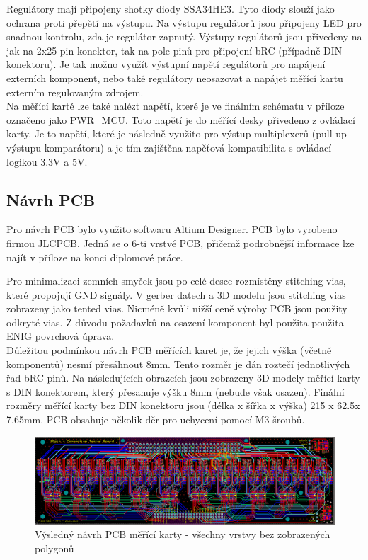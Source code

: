 Regulátory mají připojeny shotky diody SSA34HE3. Tyto diody slouží jako ochrana proti přepětí na výstupu.
Na výstupu regulátorů jsou připojeny LED pro snadnou kontrolu, zda je regulátor zapnutý.
Výstupy regulátorů jsou přivedeny na jak na 2x25 pin konektor, tak na pole pinů pro připojení bRC (případně DIN konektoru).
Je tak možno využít výstupní napětí regulátorů pro napájení externích komponent, nebo
také regulátory neosazovat a napájet měřící kartu externím regulovaným zdrojem.\\

Na měřící kartě lze také nalézt napětí, které je ve finálním schématu v příloze označeno jako PWR\_MCU.
Toto napětí je do měřící desky přivedeno z ovládací karty. Je to napětí, které je následně využito
pro výstup multiplexerů (pull up výstupu komparátoru) a je tím zajištěna napěťová kompatibilita s ovládací logikou 3.3V a 5V.


\subsection{Návrh PCB}
Pro návrh PCB bylo využito softwaru Altium Designer. PCB bylo vyrobeno firmou
JLCPCB. Jedná se o 6-ti vrstvé PCB, přičemž podrobnější informace lze najít v příloze na konci diplomové práce.

Pro minimalizaci zemních smyček jsou po celé desce rozmístěny stitching vias,
které propojují GND signály.
V gerber datech a 3D modelu jsou stitching vias zobrazeny jako tented vias. Nicméně kvůli nižší ceně výroby PCB
jsou použity odkryté vias.
Z důvodu požadavků na osazení komponent byl použita použita ENIG povrchová úprava.\\

Důležitou podmínkou návrh PCB měřících karet je, že jejich výška (včetně komponentů) nesmí přesáhnout 8mm.
Tento rozměr je dán roztečí jednotlivých řad bRC pinů. Na následujících obrazcích jsou zobrazeny 3D modely měřící karty
s DIN konektorem, který přesahuje výšku 8mm (nebude však osazen). Finální rozměry měřící karty bez DIN konektoru jsou
(délka x šířka x výška) 215 x 62.5x 7.65mm. PCB obsahuje několik děr pro uchycení pomocí M3 šroubů.

\begin{figure}[ht!]
    \centering
    \includegraphics[width = 1\textwidth]{obrazky/all_layers_no_poly.png}
    \caption{Výsledný návrh PCB měřící karty - všechny vrstvy bez zobrazených polygonů}
    \label{fig:Všechny vrstvy bez polygonů}
\end{figure}
